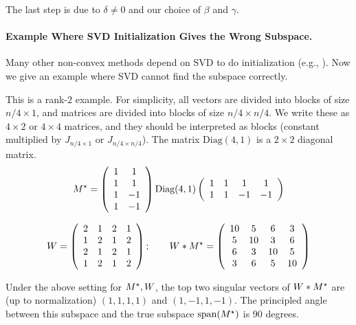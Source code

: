 The last step is due to $\delta \neq 0$ and our choice of $\beta$ and $\gamma$.

\paragraph{Example Where SVD Initialization Gives the Wrong Subspace.}

Many other non-convex methods depend on SVD to do initialization (e.g., \citep{jain2013low, hardt2014understanding}). Now we give an example where SVD cannot find the subspace correctly.

This is a rank-$2$ example.
For simplicity, all vectors are divided into blocks of size $n/4 \times 1$, and matrices are divided into blocks of size $n/4\times n/4$.
We write these as $4 \times 2$ or $4\times 4$ matrices, and they should be interpreted as blocks (constant multiplied by $J_{n/4\times 1}$ or $J_{n/4\times n/4}$).
The matrix $\mbox{Diag}(4,1)$ is a $2 \times 2$ diagonal matrix.
\[
M^\star = \left(\begin{array}{cc}1 & 1 \\ 1 & 1 \\ 1 & -1 \\ 1 & -1\end{array}\right) \mbox{Diag}(4,1)\left(\begin{array}{cccc}1 & 1 & 1 & 1 \\ 1 & 1 & -1 & -1\end{array}\right)
\]

\[
W = \left(\begin{array}{cccc}2 & 1 & 2 & 1 \\ 1 & 2 & 1 & 2 \\2 &1 & 2 & 1  \\ 1 & 2 & 1 & 2\end{array}\right); \qquad W*M^\star =  \left(\begin{array}{cccc}10 & 5 & 6 & 3 \\ 5 & 10 & 3 & 6 \\6 &3 & 10 & 5  \\ 3 & 6 & 5 & 10\end{array}\right)
\]

\begin{lemma}
Under the above setting for $M^\star, W$, the top two singular vectors of $W*M^\star$ are (up to normalization) $(1,1,1,1)$ and $(1,-1,1,-1)$. The principled angle between this subspace and the true subspace $\mbox{span}(M^\star)$ is 90 degrees.
\end{lemma}

